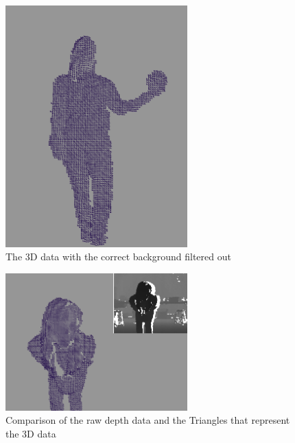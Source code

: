 \documentclass[pdftex,10.5pt]{report}
\begin{document}
\begin{figure}[H]
	\centering
	\includegraphics[width=70mm]{figures/cadyholdingball.png}
	\caption{The 3D data with the correct background filtered out}
	\label{balls2}
\end{figure}

\begin{figure}[H]
	\centering
	\includegraphics[width=70mm]{figures/cadyholdingball2.png}
	\caption{Comparison of the raw depth data and the Triangles that represent the 3D data}
	\label{balls2}
\end{figure}
\end{document}
